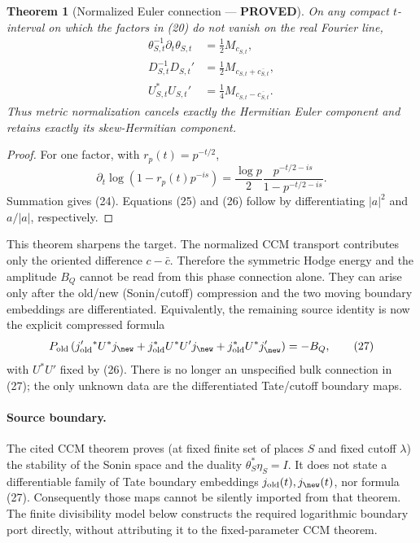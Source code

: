 \documentclass[11pt]{article}
\newtheorem{theorem}{Theorem}
\newcommand{\PROVED}{\textcolor{green!45!black}{\textbf{PROVED}}}
\newcommand{\old}{\mathrm{old}}
\begin{document}
\begin{theorem}[Normalized Euler connection --- \PROVED]
On any compact $t$-interval on which the factors in (20) do not vanish on the
real Fourier line,
\begin{align}
 \theta_{S,t}^{-1}\partial_t\theta_{S,t}
   &=\frac12M_{c_{S,t}},                                 \tag{24}\\
 D_{S,t}^{-1}D_{S,t}'
   &=\frac12M_{c_{S,t}+\overline{c_{S,t}}},              \tag{25}\\
 U_{S,t}^*U_{S,t}'
   &=\frac14M_{c_{S,t}-\overline{c_{S,t}}}.              \tag{26}
\end{align}
Thus metric normalization cancels exactly the Hermitian Euler component and
retains exactly its skew-Hermitian component.
\end{theorem}

\begin{proof}
For one factor, with $r_p(t)=p^{-t/2}$,
\[
 \partial_t\log(1-r_p(t)p^{-is})
 =\frac{\log p}{2}\frac{p^{-t/2-is}}
 {1-p^{-t/2-is}}.
\]
Summation gives (24).  Equations (25) and (26) follow by differentiating
$|a|^2$ and $a/|a|$, respectively.
\end{proof}

This theorem sharpens the target.  The normalized CCM transport contributes
only the oriented difference $c-\bar c$.  Therefore the symmetric Hodge
energy and the amplitude $B_Q$ cannot be read from this phase connection
alone.  They can arise only after the old/new (Sonin/cutoff) compression and
the two moving boundary embeddings are differentiated.  Equivalently, the
remaining source identity is now the explicit compressed formula
\begin{equation}
 P_{\old}\left(
 j_{\old}'{}^*U^*j_{\new}
 +j_{\old}^*U^*U'j_{\new}
 +j_{\old}^*U^*j_{\new}'
 \right)
 =-B_Q,                                                  \tag{27}
\end{equation}
with $U^*U'$ fixed by (26).  There is no longer an unspecified bulk
connection in (27); the only unknown data are the differentiated Tate/cutoff
boundary maps.

\paragraph{Source boundary.}
The cited CCM theorem proves (at fixed finite set of places $S$ and fixed
cutoff $\lambda$) the stability of the Sonin space and the duality
$\theta_S^*\eta_S=I$.  It does not state a differentiable family of Tate
boundary embeddings $j_{\old}(t),j_{\new}(t)$, nor formula (27).  Consequently
those maps cannot be silently imported from that theorem.  The finite
divisibility model below constructs the required logarithmic boundary port
directly, without attributing it to the fixed-parameter CCM theorem.
\end{document}
